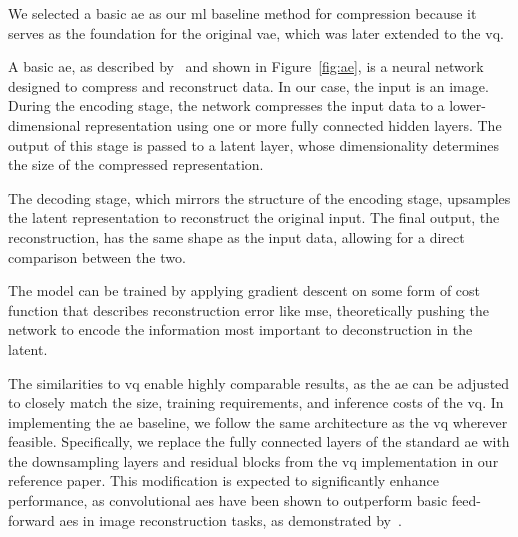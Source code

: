 We selected a basic \ac{ae} as our \ac{ml} baseline method for compression because it serves as the foundation
for the original \ac{vae}, which was later extended to the \ac{vq}.

A basic \ac{ae}, as described by~\cite{autoenc} and shown in Figure~\ref{fig:ae}, is a neural network designed to compress and reconstruct data. In our case, the input is an image. During the encoding stage, the network compresses the input data to a lower-dimensional representation using one or more fully connected hidden layers.
The output of this stage is passed to a latent layer, whose dimensionality determines the size of the compressed representation.

The decoding stage, which mirrors the structure of the encoding stage, upsamples the latent representation to reconstruct the original input.
The final output, the reconstruction, has the same shape as the input data, allowing for a direct comparison between the two.

The model can be trained by applying gradient descent on some form of cost function that describes reconstruction error
like \ac{mse}, theoretically pushing the network to encode the information most important to deconstruction in the
latent.

The similarities to \ac{vq} enable highly comparable results, as the \ac{ae} can be adjusted to closely match the
size, training requirements, and inference costs of the \ac{vq}.
In implementing the \ac{ae} baseline, we follow the same architecture as the \ac{vq} wherever feasible.
Specifically, we replace the fully connected layers of the standard \ac{ae} with the downsampling layers and
residual blocks from the \ac{vq} implementation in our reference paper.
This modification is expected to significantly enhance performance, as convolutional \ac{ae}s have been shown to
outperform basic feed-forward \ac{ae}s in image reconstruction tasks, as demonstrated by~\cite{convae}.

